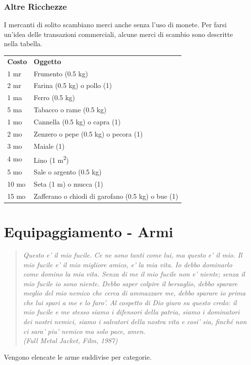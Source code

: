 \documentclass[a4paper,11pt,twoside,openany]{book}
\begin{document}
{\bigskip

\subsubsection{Altre Ricchezze}

I mercanti di solito scambiano merci anche senza l'uso di monete.
Per farsi un'idea delle transazioni commerciali, alcune merci di scambio sono descritte nella tabella.

\bigskip

\begin{tabular}{ll}
\toprule
\textbf{Costo} & \textbf{Oggetto}\tabularnewline
1 mr & Frumento (0.5 kg)\tabularnewline
2 mr & Farina (0.5 kg) o pollo (1)\tabularnewline
1 ma & Ferro (0.5 kg)\tabularnewline
5 ma & Tabacco o rame (0.5 kg)\tabularnewline
1 mo & Cannella (0.5 kg) o capra (1)\tabularnewline
2 mo & Zenzero o pepe (0.5 kg) o pecora (1)\tabularnewline
3 mo & Maiale (1)\tabularnewline
4 mo & Lino (1 m\textsuperscript{2})\tabularnewline
5 mo & Sale o argento (0.5 kg)\tabularnewline
10 mo & Seta (1 m) o mucca (1)\tabularnewline
15 mo & Zafferano o chiodi di garofano (0.5 kg) o bue (1)\tabularnewline
\end{tabular}

\pagebreak

\section{Equipaggiamento - Armi}

\label{equipaggiamento---armi}
\begin{quote}\textit{
Questo e' il mio fucile. Ce ne sono tanti come lui, ma questo e' il mio. Il mio fucile e' il mio migliore amico, e' la mia vita. Io debbo dominarlo come domino la mia vita. Senza di me il mio fucile non e' niente; senza il mio fucile io sono niente. Debbo saper colpire il bersaglio, debbo sparare meglio del mio nemico che cerca di ammazzare me, debbo sparare io prima che lui spari a me e lo faro'. Al cospetto di Dio giuro su questo credo: il mio fucile e me stesso siamo i difensori della patria, siamo i dominatori dei nostri nemici, siamo i salvatori della nostra vita e cosi' sia, finché non ci sara' piu' nemico ma solo pace, amen.
\\
(Full Metal Jacket, Film, 1987)
}\end{quote}

Vengono elencate le arme suddivise per categorie.

}
\end{document}
